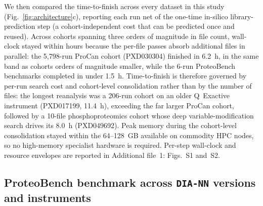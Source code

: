 We then compared the time-to-finish across every dataset in this study (Fig.~\ref{fig:architecture}c), reporting each run net of the one-time in-silico library-prediction step (a cohort-independent cost that can be predicted once and reused). Across cohorts spanning three orders of magnitude in file count, wall-clock stayed within hours because the per-file passes absorb additional files in parallel: the 5{,}798-run ProCan cohort (PXD030304) finished in 6.2~h, in the same band as cohorts orders of magnitude smaller, while the 6-run ProteoBench benchmarks completed in under 1.5~h. Time-to-finish is therefore governed by per-run search cost and cohort-level consolidation rather than by the number of files: the longest reanalysis was a 206-run cohort on an older Q~Exactive instrument (PXD017199, 11.4~h), exceeding the far larger ProCan cohort, followed by a 10-file phosphoproteomics cohort whose deep variable-modification search drives its 8.0~h (PXD049692). Peak memory during the cohort-level consolidation stayed within the 64--128~GB available on commodity HPC nodes, so no high-memory specialist hardware is required. Per-step wall-clock and resource envelopes are reported in Additional file~1: Figs.~S1 and~S2.

\subsection{ProteoBench benchmark across \texttt{DIA-NN} versions and instruments}
\label{sec:proteobench}

